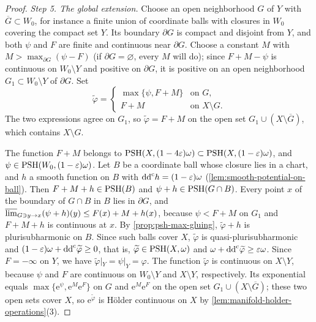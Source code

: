 \begin{proof}
\emph{Step 5. The global extension.} Choose an open neighborhood $G$ of $Y$ with $\overline G\subset W_0$, for instance a finite union of coordinate balls with closures in $W_0$ covering the compact set $Y$. Its boundary $\partial G$ is compact and disjoint from $Y$, and both $\psi$ and $F$ are finite and continuous near $\partial G$. Choose a constant $M$ with $M>\max_{\partial G}(\psi-F)$ (if $\partial G=\varnothing$, every $M$ will do); since $F+M-\psi$ is continuous on $W_0\setminus Y$ and positive on $\partial G$, it is positive on an open neighborhood $G_1\subset W_0\setminus Y$ of $\partial G$. Set
\[
 \widetilde\varphi=
 \begin{cases}
  \max\{\psi,F+M\}&\text{on }G,\\
  F+M&\text{on }X\setminus G.
 \end{cases}
\]
The two expressions agree on $G_1$, so $\widetilde\varphi=F+M$ on the open set $G_1\cup(X\setminus\overline G)$, which contains $X\setminus G$.

The function $F+M$ belongs to $\mathrm{PSH}(X,(1-4\varepsilon)\omega)\subset\mathrm{PSH}(X,(1-\varepsilon)\omega)$, and $\psi\in\mathrm{PSH}(W_0,(1-\varepsilon)\omega)$. Let $B$ be a coordinate ball whose closure lies in a chart, and $h$ a smooth function on $B$ with $\mathrm{dd}^{\mathrm{c}} h=(1-\varepsilon)\omega$ (\cref{lem:smooth-potential-on-ball}). Then $F+M+h\in\mathrm{PSH}(B)$ and $\psi+h\in\mathrm{PSH}(G\cap B)$. Every point $x$ of the boundary of $G\cap B$ in $B$ lies in $\partial G$, and $\varlimsup_{G\ni y\to x}(\psi+h)(y)\leq F(x)+M+h(x)$, because $\psi<F+M$ on $G_1$ and $F+M+h$ is continuous at $x$. By \cref{prop:psh-max-gluing}, $\widetilde\varphi+h$ is plurisubharmonic on $B$. Since such balls cover $X$, $\widetilde\varphi$ is quasi-plurisubharmonic and $(1-\varepsilon)\omega+\mathrm{dd}^{\mathrm{c}}\widetilde\varphi\geq0$, that is, $\widetilde\varphi\in\mathrm{PSH}(X,\omega)$ and $\omega+\mathrm{dd}^{\mathrm{c}}\widetilde\varphi\geq\varepsilon\omega$. Since $F=-\infty$ on $Y$, we have $\widetilde\varphi|_Y=\psi|_Y=\varphi$. The function $\widetilde\varphi$ is continuous on $X\setminus Y$, because $\psi$ and $F$ are continuous on $W_0\setminus Y$ and $X\setminus Y$, respectively. Its exponential equals $\max\{\mathrm e^\psi,\mathrm e^M\mathrm e^F\}$ on $G$ and $\mathrm e^M\mathrm e^F$ on the open set $G_1\cup(X\setminus\overline G)$; these two open sets cover $X$, so $\mathrm e^{\widetilde\varphi}$ is H\"older continuous on $X$ by \cref{lem:manifold-holder-operations}(3).


\end{proof}
